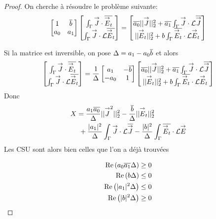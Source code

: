       \begin{proof}
        On cherche à résoudre le problème suivante:
        \[
          \begin{bmatrix}
            1 & {\overline{b}} \\
            a_0 & a_1
          \end{bmatrix}
          \begin{bmatrix}
            \int_\Gamma {\overset{\rightarrow}{J}} \cdot {\overline{{\overset{\rightarrow}{E}}_t}} \\
            \int_\Gamma {\overset{\rightarrow}{J}}\cdot \mathcal{L}{\overline{{\overset{\rightarrow}{E}}_t}}
          \end{bmatrix}
          =
          \begin{bmatrix}
            {\overline{a_0}}||{\overset{\rightarrow}{J}}||_2^2 + {\overline{a_1}}\int_\Gamma {\overset{\rightarrow}{J}} \cdot \mathcal{L}{\overline{{\overset{\rightarrow}{J}}}} \\
            ||{\overset{\rightarrow}{E}}_t||_2^2 + b\int_\Gamma {\overline{{\overset{\rightarrow}{E}}_t}} \cdot \mathcal{L}{\overset{\rightarrow}{E}}_t
          \end{bmatrix}
        \]

        Si la matrice est inversible, on pose \(\Delta = a_1 - a_0{\overline{b}}\) et alors
        \[
        \begin{bmatrix}
          \int_\Gamma {\overset{\rightarrow}{J}} \cdot {\overline{{\overset{\rightarrow}{E}}_t}} \\
          \int_\Gamma {\overset{\rightarrow}{J}}\cdot \mathcal{L}{\overline{{\overset{\rightarrow}{E}}_t}}
        \end{bmatrix}
        =\dfrac{1}{\Delta}
        \begin{bmatrix}
          a_1 & -{\overline{b}} \\
          -a_0 & 1
        \end{bmatrix}
        \begin{bmatrix}
          {\overline{a_0}}||{\overset{\rightarrow}{J}}||_2^2 + {\overline{a_1}}\int_\Gamma {\overset{\rightarrow}{J}} \cdot \mathcal{L}{\overline{{\overset{\rightarrow}{J}}}} \\
          ||{\overset{\rightarrow}{E}}_t||_2^2 + b\int_\Gamma {\overline{{\overset{\rightarrow}{E}}_t}} \cdot \mathcal{L}{\overset{\rightarrow}{E}}_t
        \end{bmatrix}
        \]
        Donc
        \begin{align*}
          X &=  \dfrac{a_1{\overline{a_0}}}{\Delta}||{\overset{\rightarrow}{J}}^2||_2^2 - \dfrac{{\overline{b}}}{\Delta}||{\overset{\rightarrow}{E}}_t||_2^2 \\
          &~+\dfrac{|a_1|^2}{\Delta}\int_\Gamma{\overset{\rightarrow}{J}}\cdot \mathcal{L} {\overline{{\overset{\rightarrow}{J}}}} - \dfrac{|b|^2}{\Delta}\int_\Gamma{\overline{{\overset{\rightarrow}{E}}_t}}\cdot \mathcal{L}{\overset{\rightarrow}{E}}
        \end{align*}
        Les CSU sont alors bien celles que l'on a déjà trouvées

          \begin{align}
          \operatorname{Re}\left(a_0{\overline{a_1}}\Delta\right) &\ge 0\\
          \operatorname{Re}\left(b\Delta\right) &\le 0\\
          \operatorname{Re}\left(|a_1|^2\Delta\right) &\le 0\\
          \operatorname{Re}\left(|b|^2\Delta\right) &\ge 0
        \end{align}



\end{proof}
